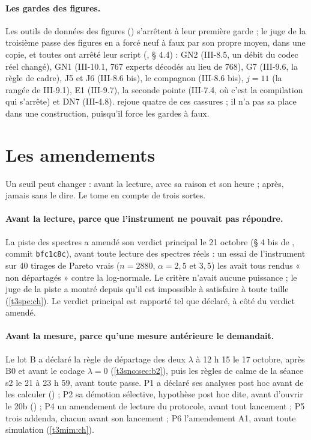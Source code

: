 \paragraph{Les gardes des figures.} Les outils de données des figures () s'arrêtent à leur première garde ; le juge de la troisième passe des figures en a forcé neuf à faux par son propre moyen, dans une copie, et toutes ont arrêté leur script (, § 4.4) : GN2 (III-8.5, un débit du codec réel changé), GN1 (III-10.1, 767 experts décodés au lieu de 768), G7 (III-9.6, la règle de cadre), J5 et J6 (III-8.6 bis), le compagnon (III-8.6 bis), $j = 11$ (la rangée de III-9.1), E1 (III-9.7), la seconde pointe (III-7.4, où c'est la compilation qui s'arrête) et DN7 (III-4.8).  rejoue quatre de ces cassures ; il n'a pas sa place dans une construction, puisqu'il force les gardes à faux.

\section{Les amendements}\label{t3ann:sec:amendements}

Un seuil peut changer : avant la lecture, avec sa raison et son heure ; après, jamais sans le dire. Le tome en compte de trois sortes.

\paragraph{Avant la lecture, parce que l'instrument ne pouvait pas répondre.} La piste des spectres a amendé son verdict principal le 21 octobre (§ 4 bis de , commit \texttt{bfc1c8c}), avant toute lecture des spectres réels : un essai de l'instrument sur 40 tirages de Pareto vrais ($n = \num{2880}$, $\alpha = 2{,}5$ et $3{,}5$) les avait tous rendus « non départagés » contre la log-normale. Le critère n'avait aucune puissance ; le juge de la piste a montré depuis qu'il est impossible à satisfaire à toute taille (\cref{t3spe:ch}). Le verdict principal est rapporté tel que déclaré, à côté du verdict amendé.

\paragraph{Avant la mesure, parce qu'une mesure antérieure le demandait.} Le lot B a déclaré la règle de départage des deux $\lambda$ à 12 h 15 le 17 octobre, après B0 et avant le codage $\lambda = 0$ (\cref{t3sno:sec:b2}), puis les règles de calme de la séance s2 le 21 à 23 h 59, avant toute passe. P1 a déclaré ses analyses post hoc avant de les calculer () ; P2 sa démotion sélective, hypothèse post hoc dite, avant d'ouvrir le 20b () ; P4 un amendement de lecture du protocole, avant tout lancement ; P5 trois addenda, chacun avant son lancement ; P6 l'amendement A1, avant toute simulation (\cref{t3mim:ch}).

